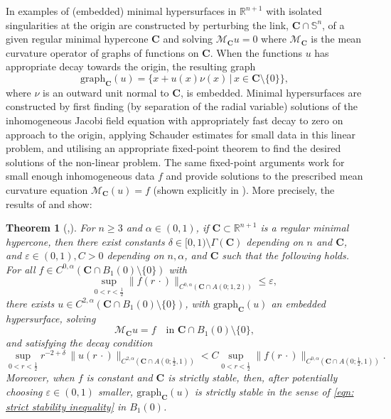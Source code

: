 \documentclass[12pt]{article}
\newtheorem{theorem}{Theorem}
\begin{document}
\bigskip

In \cite{CHS84} examples of (embedded) minimal hypersurfaces in $\mathbb{R}^{n+1}$ with isolated singularities at the origin are constructed by perturbing the link, $\mathbf{C} \cap \mathbb{S
}^n$, of a given regular minimal hypercone $\mathbf{C}$ and solving $\mathcal{M}_\mathbf{C}u = 0$ where $\mathcal{M}_\mathbf{C}$ is the mean curvature operator of graphs of functions on $\mathbf{C}$. When the functions $u$ has appropriate decay towards the origin, the resulting graph 
$$\mathrm{graph}_{\mathbf{C}}(u) = \{x + u(x)\nu(x) \, | \, x \in \mathbf{C} \setminus \{0\}\},$$
where $\nu$ is an outward unit normal to $\mathbf{C}$, is embedded. Minimal hypersurfaces are constructed by first finding (by separation of the radial variable)
solutions of the inhomogeneous Jacobi field equation with appropriately fast decay to zero on approach to the origin, applying Schauder
estimates for small data in this linear problem, and utilising an appropriate fixed-point theorem to find the desired solutions of the non-linear problem. The same fixed-point arguments work for small enough inhomogeneous data $f$ and provide solutions to the prescribed mean curvature equation $\mathcal{M}_\mathbf{C}(u) = f$ (shown explicitly in \cite{I17}). More precisely, the results of \cite{CHS84} and \cite{I17} show:

\begin{theorem}[\cite{CHS84},\cite{I17}]\label{thm: CMC CHS} 
    For $n\ge 3$ and $\alpha \in (0,1)$, if $\mathbf{C} \subset \mathbb{R}^{n+1}$ is a regular minimal hypercone, then there exist constants $\delta \in [0,1) \setminus \Gamma(\mathbf{C})$ depending on $n$ and $\mathbf{C}$, and $\varepsilon \in (0,1), C > 0$ depending on $n, \alpha$, and $\mathbf{C}$ such that the following holds. For all 
    $f \in C^{0,\alpha}(\mathbf{C} \cap B_1(0) \setminus \{0\})$ with
    $$
    \sup_{0<r<\frac{1}{2}} \|f(r\, \cdot)\|_{C^{0,\alpha}(\mathbf{C} \cap A(0;1,2))}\le \varepsilon,
    $$
    there exists $u \in C^{2,\alpha}(\mathbf{C} \cap B_1(0) \setminus \{0\})$, with $\mathrm{graph}_{\mathbf{C}}(u)$ an embedded hypersurface, solving
    $$
    \mathcal{M}_{\mathbf{C}} u = f \quad \text{in } \mathbf{C} \cap B_1(0) \setminus \{0\},
    $$
    and satisfying the decay condition
    $$
    \sup_{0<r<\frac{1}{2}} r^{-2+\delta}\,\|u(r\, \cdot)\|_{C^{2,\alpha}(\mathbf{C} \cap A(0;\frac{1}{2},1))}< C \sup_{0 < r < \frac{1}{2}}\|f(r\, \cdot)\|_{C^{0,\alpha}(\mathbf{C} \cap A(0;\frac{1}{2},1))}.
    $$
    Moreover, when $f$ is constant and $\mathbf{C}$ is strictly stable, then, after potentially choosing $\varepsilon \in (0,1)$ smaller, $\mathrm{graph}_{\mathbf{C}}(u)$ is strictly stable in the sense of \eqref{eqn: strict stability inequality} in $B_1(0)$.
\end{theorem}
\end{document}
